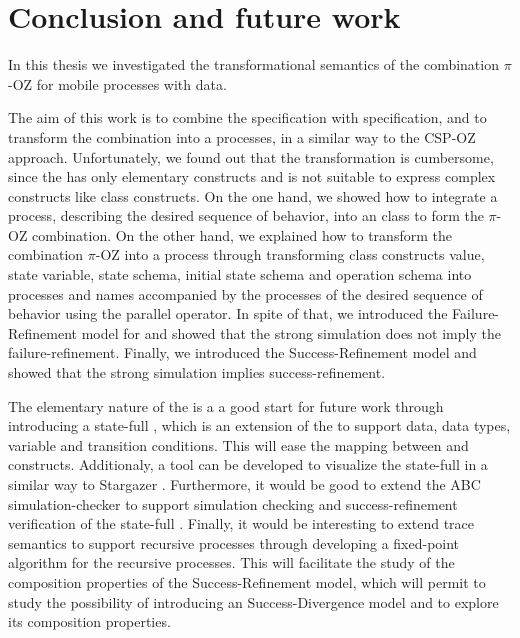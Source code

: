\chapter{Conclusion and future work}
\label{sec_conclusion}
In this thesis we investigated the transformational semantics of the combination $\pi$-OZ for mobile processes with data.

The aim of this work is to combine the \oz{} specification with \picalc{} specification, and to transform the combination into a \picalc{} processes, in a similar way to the CSP-OZ \cite{olderog} approach. Unfortunately, we found out that the transformation is cumbersome, since the \picalc{} has only elementary constructs and is not suitable to express complex constructs like \oz{} class constructs. On the one hand, we showed how to integrate a \picalc{} process, describing the desired sequence of behavior, into an \oz{} class to form the $\pi$-OZ combination. On the other hand, we explained how to transform the combination $\pi$-OZ into a \picalc{} process through transforming \oz{} class constructs value, state variable, state schema, initial state schema and operation schema into \picalc{} processes and names accompanied by the processes of the desired sequence of behavior using the parallel operator. In spite of that, we introduced the Failure-Refinement model for \picalc{} and showed that the strong simulation does not imply the failure-refinement. Finally, we introduced the Success-Refinement model and showed that the strong simulation implies success-refinement. 

The elementary nature of the \picalc{} is a a good start for future work through introducing a state-full \picalc{}, which is an extension of the \picalc{} to support data, data types, variable and transition conditions. This will ease the mapping between \oz{} and \picalc{} constructs. Additionaly, a tool can be developed to visualize the state-full \picalc{} in a similar way to Stargazer \cite{stargazer}. Furthermore, it would be good to extend the ABC simulation-checker \cite{abc} to support simulation checking and success-refinement verification of the state-full \picalc{}. Finally, it would be interesting to extend \cite{gieseking} trace semantics to support recursive processes through developing a fixed-point algorithm for the recursive processes. This will facilitate the study of the composition properties of the Success-Refinement model, which will permit to study the possibility of introducing an Success-Divergence model and to explore its composition properties.
